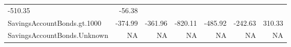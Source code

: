 \documentclass[]{article}
\begin{document}
\begin{longtable}[]{@{}lrrrrrr@{}}
\begin{minipage}[t]{0.08\columnwidth}
-510.35\strut
\end{minipage} & \begin{minipage}[t]{0.08\columnwidth}\raggedleft\strut
-56.38\strut
\end{minipage}\tabularnewline
\begin{minipage}[t]{0.31\columnwidth}\raggedright\strut
SavingsAccountBonds.gt.1000\strut
\end{minipage} & \begin{minipage}[t]{0.10\columnwidth}\raggedleft\strut
-374.99\strut
\end{minipage} & \begin{minipage}[t]{0.08\columnwidth}\raggedleft\strut
-361.96\strut
\end{minipage} & \begin{minipage}[t]{0.08\columnwidth}\raggedleft\strut
-820.11\strut
\end{minipage} & \begin{minipage}[t]{0.08\columnwidth}\raggedleft\strut
-485.92\strut
\end{minipage} & \begin{minipage}[t]{0.08\columnwidth}\raggedleft\strut
-242.63\strut
\end{minipage} & \begin{minipage}[t]{0.08\columnwidth}\raggedleft\strut
310.33\strut
\end{minipage}\tabularnewline
\begin{minipage}[t]{0.31\columnwidth}\raggedright\strut
SavingsAccountBonds.Unknown\strut
\end{minipage} & \begin{minipage}[t]{0.10\columnwidth}\raggedleft\strut
NA\strut
\end{minipage} & \begin{minipage}[t]{0.08\columnwidth}\raggedleft\strut
NA\strut
\end{minipage} & \begin{minipage}[t]{0.08\columnwidth}\raggedleft\strut
NA\strut
\end{minipage} & \begin{minipage}[t]{0.08\columnwidth}\raggedleft\strut
NA\strut
\end{minipage} & \begin{minipage}[t]{0.08\columnwidth}\raggedleft\strut
NA\strut
\end{minipage} & \begin{minipage}[t]{0.08\columnwidth}\raggedleft\strut
NA\strut
\end{minipage}\tabularnewline

\end{longtable}
\end{document}
